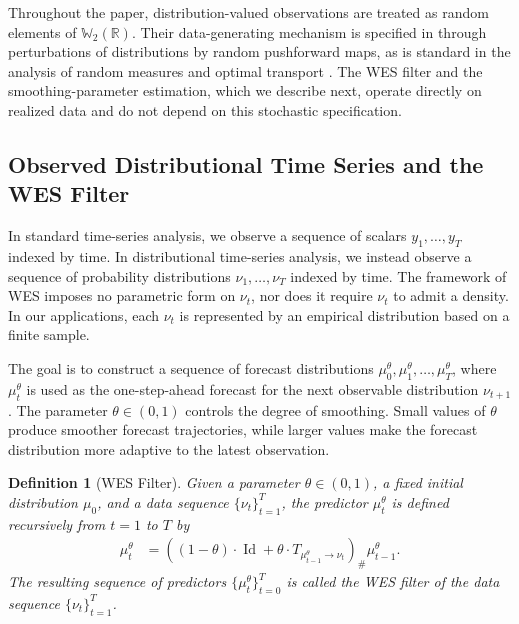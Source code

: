 \documentclass[a4paper, 11pt]{article}
\newcommand{\R}{\mathbb{R}}
\newtheorem{definition}{Definition}
\theoremstyle{definition}
\begin{document}
Throughout the paper, distribution-valued observations are treated as random elements of $\mathbb{W}_2(\R)$.
Their data-generating mechanism is specified in  through perturbations of distributions by random pushforward maps, as is standard in the analysis of random measures and optimal transport \citep{Panaretos2020}. 
The WES filter and the smoothing-parameter estimation, which we describe next, operate directly on realized data and do not depend on this stochastic specification.

\subsection{Observed Distributional Time Series and the WES Filter} \label{sec:setup} \label{sec:estimate}

In standard time-series analysis, we observe a sequence of scalars $y_1,\ldots,y_T$ indexed by time.
In distributional time-series analysis, we instead observe a sequence of probability distributions $\nu_1,\ldots,\nu_T$ indexed by time.
The framework of WES imposes no parametric form on $\nu_t$, nor does it require $\nu_t$ to admit a density.
In our applications, each $\nu_t$ is represented by an empirical distribution based on a finite sample.

The goal is to construct a sequence of forecast distributions $\mu_0^\theta,\mu_1^\theta,\ldots,\mu_T^\theta$, where $\mu_t^\theta$ is used as the one-step-ahead forecast for the next observable distribution $\nu_{t+1}$.
The parameter $\theta\in(0,1)$ controls the degree of smoothing.
Small values of $\theta$ produce smoother forecast trajectories, while larger values make the forecast distribution more adaptive to the latest observation.

\begin{definition}[WES Filter]
	Given a parameter $\theta \in (0, 1)$, a fixed initial distribution $\mu_0$, and a data sequence $\{ \nu_t \}_{t=1}^{T}$, the predictor $\mu_t^{\theta}$ is defined recursively from $t = 1$ to $T$ by
	\begin{align}\label{eq:WES model update}
        \mu_{t}^{\theta} & = \left( (1 - \theta) \cdot \operatorname{Id} + \theta \cdot T_{\mu_{t-1}^{\theta} \to \nu_{t}} \right)_{\#} \mu_{t-1}^{\theta} .
	\end{align}
	The resulting sequence of predictors $\{ \mu_t^{\theta} \}_{t=0}^{T}$ is called the WES filter of the data sequence $\{ \nu_t \}_{t=1}^{T}$.
\end{definition}
\end{document}
